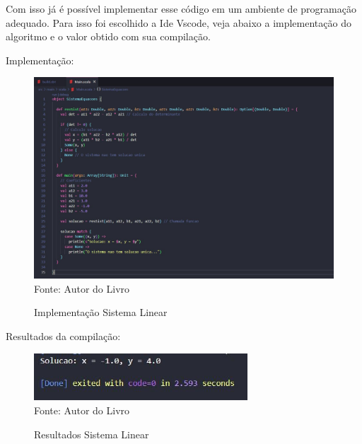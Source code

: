  	 Com isso já é possível implementar esse código em um ambiente de programação adequado. Para isso foi escolhido a Ide Vscode, veja abaixo a implementação do algoritmo e o valor obtido com sua compilação.
 	 
 	 Implementação:
 	 
 	 \begin{figure}[H]
 	 	\centering
 	 	\caption{Implementação Sistema Linear}
 	 	\label{Implementação Sistema Linear}
 	 	\includegraphics[width=17cm]{Pictures/Sist.jpg} \\
 	 	Fonte: Autor do Livro
 	 \end{figure}
  
  
	 Resultados da compilação:
	  
	\begin{figure}[H]
	 	\centering
	 	\caption{Resultados Sistema Linear}
	 	\label{Resultados Sistema Linear}
	 	\includegraphics[width=8cm]{Pictures/resSist.jpg} \\
	 	Fonte: Autor do Livro
	\end{figure}

